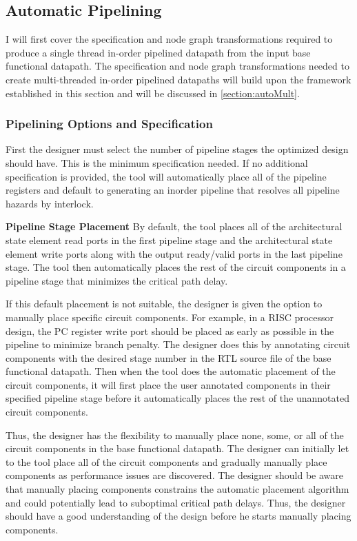 \subsection{Automatic Pipelining}
\label{section:autoPipe}
I will first cover the specification and node graph transformations required to produce a single thread in-order pipelined datapath from the input base functional datapath. The specification and node graph transformations needed to create multi-threaded in-order pipelined datapaths will build upon the framework established in this section and will be discussed in \ref{section:autoMult}.

\subsubsection{Pipelining Options and Specification}
\label{section:pipelineOptions}
First the designer must select the number of pipeline stages the optimized design should have. This is the minimum specification needed. If no additional specification is provided, the tool will automatically place all of the pipeline registers and default to generating an inorder pipeline that resolves all pipeline hazards by interlock.

{\bf Pipeline Stage Placement}
By default, the tool places all of the architectural state element read ports in the first pipeline stage and the architectural state element write ports along with the output ready/valid ports in the last pipeline stage. The tool then automatically places the rest of the circuit components in a pipeline stage that minimizes the critical path delay.

If this default placement is not suitable, the designer is given the option to manually place specific circuit components. For example, in a RISC processor design, the PC register write port should be placed as early as possible in the pipeline to minimize branch penalty. The designer does this by annotating circuit components with the desired stage number in the RTL source file of the base functional datapath. Then when the tool does the automatic placement of the circuit components, it will first place the user annotated components in their specified pipeline stage before it automatically places the rest of the unannotated circuit components. 

Thus, the designer has the flexibility to manually place none, some, or all of the circuit components in the base functional datapath. The designer can initially let to the tool place all of the circuit components and gradually manually place components as performance issues are discovered. The designer should be aware that manually placing components constrains the automatic placement algorithm and could potentially lead to suboptimal critical path delays. Thus, the designer should have a good understanding of the design before he starts manually placing components.

